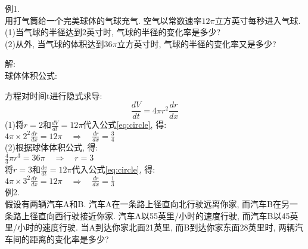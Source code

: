 \documentclass[UTF8, fontset=ubuntu, fleqn]{ctexart}
\begin{document}
例1.\\
用打气筒给一个完美球体的气球充气. 空气以常数速率$12\pi$立方英寸每秒进入气球.\\
(1)当气球的半径达到$2$英寸时, 气球的半径的变化率是多少?\\
(2)从外, 当气球的体积达到$36\pi$立方英寸时, 气球的半径的变化率又是多少?

解:\\
球体体积公式:\\[-2ex]
\begin{center}
\end{center}
方程对时间t进行隐式求导:
\begin{equation}
\displaystyle\frac{dV}{dt}=4\pi r^2\frac{dr}{dx}\label{eq:circle}
\end{equation}
(1)将$r=2$和$\frac{dV}{dt}=12\pi$代入公式\eqref{eq:circle}, 得:\\[1ex]
\phantom{(1)}$\displaystyle 4\pi\times 2^2\frac{dr}{dx}=12\pi\quad\Rightarrow\quad\frac{dr}{dx}=\frac{3}{4}$\\[1ex]
(2)根据球体体积公式, 得:\\[1ex]
\phantom{(2)}$\displaystyle\frac{4}{3}\pi r^3=36\pi\quad\Rightarrow\quad r=3$\\[1ex]
\phantom{(2)}将$r=3$和$\frac{dv}{dt}=12\pi$代入公式\eqref{eq:circle}, 得:\\[1ex]
\phantom{(2)}$\displaystyle 4\pi\times 3^2\frac{dr}{dx}=12\pi\quad\Rightarrow\quad\frac{dr}{dx}=\frac{1}{3}$\\[2ex]

例2.\\
假设有两辆汽车A和B. 汽车A在一条路上径直向北行驶远离你家, 而汽车B在另一条路上径直向西行驶接近你家. 汽车A以55英里/小时的速度行驶, 而汽车B以45英里/小时的速度行驶. 当A到达你家北面21英里, 而B到达你家东面28英里时, 两辆汽车间的距离的变化率是多少?
\end{document}
